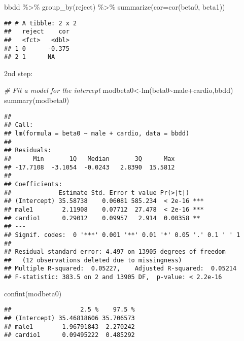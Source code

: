 \documentclass[
]{article}
\newenvironment{Shaded}{\begin{snugshade}}{\end{snugshade}}
\newcommand{\AttributeTok}[1]{\textcolor[rgb]{0.77,0.63,0.00}{#1}}
\newcommand{\CommentTok}[1]{\textcolor[rgb]{0.56,0.35,0.01}{\textit{#1}}}
\newcommand{\FunctionTok}[1]{\textcolor[rgb]{0.00,0.00,0.00}{#1}}
\newcommand{\NormalTok}[1]{#1}
\newcommand{\OtherTok}[1]{\textcolor[rgb]{0.56,0.35,0.01}{#1}}
\newcommand{\SpecialCharTok}[1]{\textcolor[rgb]{0.00,0.00,0.00}{#1}}
\begin{document}
\begin{Shaded}
\begin{Highlighting}[]
\NormalTok{bbdd }\SpecialCharTok{\%\textgreater{}\%}
  \FunctionTok{group\_by}\NormalTok{(reject) }\SpecialCharTok{\%\textgreater{}\%}
  \FunctionTok{summarize}\NormalTok{(}\AttributeTok{cor=}\FunctionTok{cor}\NormalTok{(beta0, beta1))}
\end{Highlighting}
\end{Shaded}

\begin{verbatim}
## # A tibble: 2 x 2
##   reject    cor
##   <fct>   <dbl>
## 1 0      -0.375
## 2 1      NA
\end{verbatim}

2nd step:

\begin{Shaded}
\begin{Highlighting}[]
\CommentTok{\# Fit a model for the intercept}
\NormalTok{modbeta0}\OtherTok{\textless{}{-}}\FunctionTok{lm}\NormalTok{(beta0}\SpecialCharTok{\textasciitilde{}}\NormalTok{male}\SpecialCharTok{+}\NormalTok{cardio,bbdd)}
\FunctionTok{summary}\NormalTok{(modbeta0)}
\end{Highlighting}
\end{Shaded}

\begin{verbatim}
## 
## Call:
## lm(formula = beta0 ~ male + cardio, data = bbdd)
## 
## Residuals:
##      Min       1Q   Median       3Q      Max 
## -17.7108  -3.1054  -0.0243   2.8390  15.5812 
## 
## Coefficients:
##             Estimate Std. Error t value Pr(>|t|)    
## (Intercept) 35.58738    0.06081 585.234  < 2e-16 ***
## male1        2.11908    0.07712  27.478  < 2e-16 ***
## cardio1      0.29012    0.09957   2.914  0.00358 ** 
## ---
## Signif. codes:  0 '***' 0.001 '**' 0.01 '*' 0.05 '.' 0.1 ' ' 1
## 
## Residual standard error: 4.497 on 13905 degrees of freedom
##   (12 observations deleted due to missingness)
## Multiple R-squared:  0.05227,    Adjusted R-squared:  0.05214 
## F-statistic: 383.5 on 2 and 13905 DF,  p-value: < 2.2e-16
\end{verbatim}

\begin{Shaded}
\begin{Highlighting}[]
\FunctionTok{confint}\NormalTok{(modbeta0)}
\end{Highlighting}
\end{Shaded}

\begin{verbatim}
##                   2.5 %    97.5 %
## (Intercept) 35.46818606 35.706573
## male1        1.96791843  2.270242
## cardio1      0.09495222  0.485292
\end{verbatim}
\end{document}
